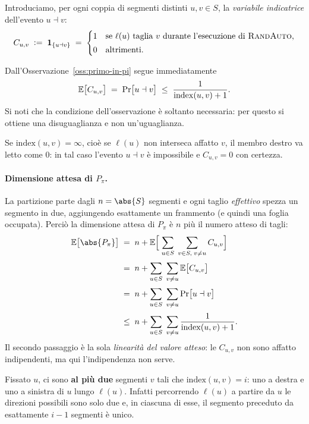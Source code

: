 
Introduciamo, per ogni coppia di segmenti distinti $u,v\in S$, la \emph{variabile indicatrice}
dell'evento $u\dashv v$:
\[
  C_{u,v}\;\vcentcolon=\;\mathbf{1}_{\{u\dashv v\}}\;=\;
  \begin{cases}
    1 & \text{se }\ell(u)\text{ taglia }v\text{ durante l'esecuzione di \textsc{RandAuto}},\\[2pt]
    0 & \text{altrimenti.}
  \end{cases}
\]

Dall'Osservazione~\ref{oss:primo-in-pi} segue immediatamente
\[
  \mathbb{E}\bigl[C_{u,v}\bigr]\;=\;\operatorname{Pr}\bigl[u\dashv v\bigr]\;\le\;\frac{1}{\mathrm{index}(u,v)+1}.
\]
Si noti che la condizione dell'osservazione è soltanto necessaria: per questo si ottiene una
disuguaglianza e non un'uguaglianza.

\begin{osservazione}
Se $\mathrm{index}(u,v)=\infty$, cioè se $\ell(u)$ non interseca affatto $v$, il membro destro
va letto come $0$: in tal caso l'evento $u\dashv v$ è impossibile e $C_{u,v}=0$ con certezza.
\end{osservazione}

\paragraph{Dimensione attesa di $P_\pi$.}
La partizione parte dagli $n=\abs{S}$ segmenti e ogni taglio \emph{effettivo} spezza un
segmento in due, aggiungendo esattamente un frammento (e quindi una foglia occupata). Perciò
la dimensione attesa di $P_\pi$ è $n$ più il numero atteso di tagli:
\begin{align*}
  \E\bigl[\abs{P_\pi}\bigr]
    &\;=\; n+\E\Bigl[\;\sum_{u\in S}\;\sum_{v\in S,\;v\neq u} C_{u,v}\Bigr]\\[2pt]
    &\;=\; n+\sum_{u\in S}\;\sum_{v\neq u}\E\bigl[C_{u,v}\bigr]\\[2pt]
    &\;=\; n+\sum_{u\in S}\;\sum_{v\neq u}\Pr\bigl[u\dashv v\bigr]\\[2pt]
    &\;\le\; n+\sum_{u\in S}\;\sum_{v\neq u}\frac{1}{\mathrm{index}(u,v)+1}.
\end{align*}
Il secondo passaggio è la sola \emph{linearità del valore atteso}: le $C_{u,v}$ non sono
affatto indipendenti, ma qui l'indipendenza non serve.

\begin{osservazione}
Fissato $u$, ci sono \textbf{al più due} segmenti $v$ tali che $\mathrm{index}(u,v)=i$: uno a
destra e uno a sinistra di $u$ lungo $\ell(u)$. Infatti percorrendo $\ell(u)$ a partire da $u$
le direzioni possibili sono solo due e, in ciascuna di esse, il segmento preceduto da
esattamente $i-1$ segmenti è unico.
\end{osservazione}

